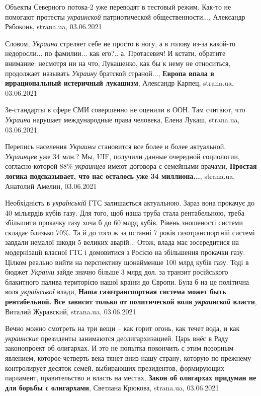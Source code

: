 Объекты Северного потока-2 уже переводят в тестовый режим. Как-то не помогают
протесты \emph{украинской} патриотической общественности..., Александр
Рябоконь, strana.ua, 03.06.2021

Словом, \emph{Украина} стреляет себе не просто в ногу, а в голову из-за какой-то
недоросли... по фамилии... как его?.. а, Протасевич!  И кстати, обратите
внимание: несмотря ни на что, Лукашенко, как бы к нему не относиться,
продолжает называть \emph{Украину} братской страной...,
\textbf{Европа впала в иррациональный истеричный лукашизм}, Александр Карпец,
strana.ua, 03.06.2021

Зе-стандарты в сфере СМИ совершенно не оценили в ООН. Там считают, что
\emph{Украина} нарушает международные права человека, Елена Лукаш, strana.ua,
03.06.2021

Перепись населения \emph{Украины} становится все более и более актуальной.
\emph{Украинцев} уже 34 млн.?  Мы, UIF, получили данные очередной социологии, согласно
которой 88\% \emph{украинцев} имеют договора с семейными врачами, \textbf{Простая
логика подсказывает, что нас осталось уже 34 миллиона...}, strana.ua, Анатолий
Амелин, 03.06.2021

Необхідність в \emph{українській} ГТС залишається актуальною.  Зараз вона прокачує до
40 мільярдів кубів газу. Для того, щоб наша труба стала рентабельною, треба
збільшити прокачку газу хоча б до 60 млрд кубів.  Рівень зношеності системи
складає близько 70\%. Та й до того ж за останні 7 років газотранспортній
системі завдали немалої шкоди 5 великих аварій... Отож, влада має зосередитися на
модернізації власної ГТС і домовитися з Росією на збільшення прокачки газу.
Цілком реально вийти на перспективу щонайменше 100 млрд кубів газу. Тоді в
бюджет \emph{України} зайде значно більше 3 млрд дол. за транзит російського
блакитного палива територією нашої країни до Європи. Була б на це політична
воля \emph{української} влади,
\textbf{Наша газотранспортная система может быть рентабельной. Все зависит
только от политической воли \emph{украинской} власти}, Виталий Журавский,
strana.ua, 03.06.2021

Вечно можно смотреть на три вещи – как горит огонь, как течет вода, и как
\emph{украинские} президенты занимаются деолигархизацией.  Царь внёс в Раду
законопроект об олигархах. И это не попытка покончить с этим позорным явлением,
которое четверть века тянет вниз нашу страну, которую по прежнему контролирует
десяток семей, выбирающих президентов, формирующих парламент, правительство и
власть на местах,
\textbf{Закон об олигархах придуман не для борьбы с олигархами}, Светлана Крюкова,
strana.ua, 03.06.2021

